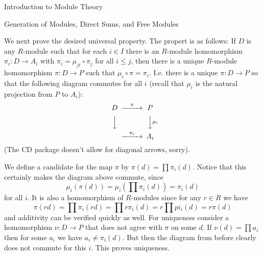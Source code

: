 \begin{chapter}{Introduction to Module Theory}
\begin{section}{Generation of Modules, Direct Sums, and Free Modules}
\begin{solution}
We next prove the desired universal property. The propert is as follows: If $D$ is any $R$-module such that for each $i\in I$ there is an $R$-module homomorphism $\pi_i:D\to A_i$ with $\pi_i = \mu_{ji}\circ \pi_j$ for all $i\le j$, then there is a unique $R$-module homomorphism $\pi:D\to P$ such that $\mu_i\circ \pi = \pi_i$. I.e. there is a unique $\pi:D\to P$ so that the following diagram commutes for all $i$ (recall that $\mu_i$ is the natural projection from $P$ to $A_i$):\[
\begin{CD}
D@>\pi >> P\\
@VVV @VV\mu_i V\\
@>\pi_i>> A_i
\end{CD}
\]
(The CD package doesn't allow for diagonal arrows, sorry).
\end{solution}\oneperpage

We define a candidate for the map $\pi$ by $\pi(d) = \prod \pi_i(d)$. Notice that this certainly makes the diagram above commute, since \[
\mu_i(\pi(d)) = \mu_i(\prod \pi_i(d)) = \pi_i(d)
\]
for all $i$. It is also a homomorphism of $R$-modules since for any $r\in R$ we have \[
\pi(rd) = \prod \pi_i(rd) = \prod r\pi_i(d) = r\prod pi_i(d) = r\pi(d)
\]
and additivity can be verified quickly as well. For uniqueness consider a homomorphism $\nu :D\to P$ that does not agree with $\pi$ on some $d$. If $\nu(d) = \prod a_i$ then for some $a_i$ we have $a_i\neq \pi_i(d)$. But then the diagram from before clearly does not commute for this $i$. This proves uniqueness.


\end{section}
\end{chapter}
